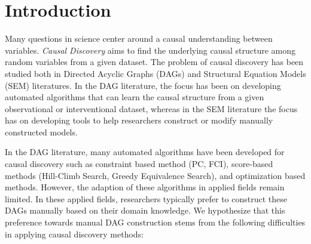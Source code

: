 \documentclass[letterpaper]{article} %
\begin{document}
\section{Introduction}

Many questions in science center around a causal understanding between
variables. \emph{Causal Discovery} aims to find the underlying causal structure
among random variables from a given dataset. The problem of causal discovery
has been studied both in Directed Acyclic Graphs (DAGs) and Structural Equation
Models (SEM) literatures. In the DAG literature, the focus has been on
developing automated algorithms that can learn the causal structure from a
given observational or interventional dataset, whereas in the SEM literature
the focus has on developing tools to help researchers construct or modify
manually constructed models.


In the DAG literature, many automated algorithms have been developed for causal
discovery such as constraint based method (PC, FCI), score-based methods
(Hill-Climb Search, Greedy Equivalence Search), and optimization based methods.
However, the adaption of these algorithms in applied fields remain limited. In
these applied fields, researchers typically prefer to construct these DAGs
manually based on their domain knowledge. We hypothesize that this preference
towards manual DAG construction stems from the following difficulties in
applying causal discovery methods:
\end{document}
